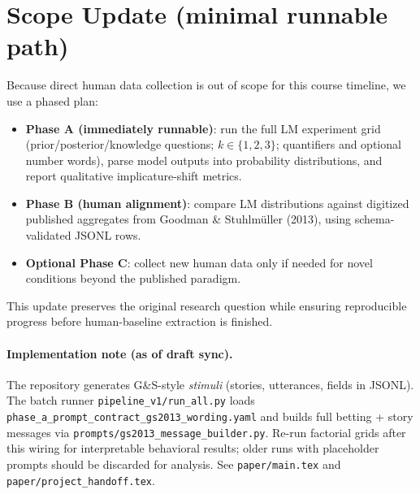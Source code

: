 \documentclass[11pt]{article}
\begin{document}
\section{Scope Update (minimal runnable path)}
Because direct human data collection is out of scope for this course timeline, we use a phased plan:
\begin{itemize}
    \item \textbf{Phase A (immediately runnable)}: run the full LM experiment grid (prior/posterior/knowledge questions; $k \in \{1,2,3\}$; quantifiers and optional number words), parse model outputs into probability distributions, and report qualitative implicature-shift metrics.
    \item \textbf{Phase B (human alignment)}: compare LM distributions against digitized published aggregates from Goodman \& Stuhlmüller (2013), using schema-validated JSONL rows.
    \item \textbf{Optional Phase C}: collect new human data only if needed for novel conditions beyond the published paradigm.
\end{itemize}
This update preserves the original research question while ensuring reproducible progress before human-baseline extraction is finished.

\paragraph{Implementation note (as of draft sync).}
The repository generates G\&S-style \emph{stimuli} (stories, utterances, fields in JSONL). The batch runner \texttt{pipeline\_v1/run\_all.py} loads \texttt{phase\_a\_prompt\_contract\_gs2013\_wording.yaml} and builds full betting + story messages via \texttt{prompts/gs2013\_message\_builder.py}. Re-run factorial grids after this wiring for interpretable behavioral results; older runs with placeholder prompts should be discarded for analysis. See \texttt{paper/main.tex} and \texttt{paper/project\_handoff.tex}.
\end{document}
